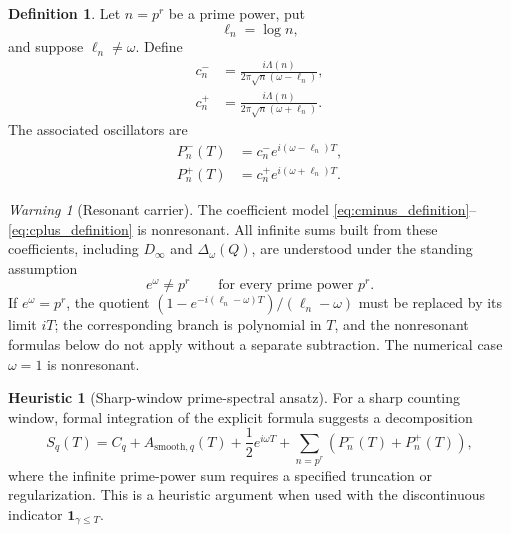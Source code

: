 \documentclass[11pt]{amsart}
\numberwithin{equation}{section}
\theoremstyle{plain}
\theoremstyle{definition}
\newtheorem{definition}[theorem]{Definition}
\newtheorem{heuristic}[theorem]{Heuristic}
\theoremstyle{remark}
\newtheorem{warning}[theorem]{Warning}
\newcommand{\1}{\mathbf{1}}
\begin{document}
\begin{definition}
\label{def:prime_power_coefficients}
Let \(n=p^r\) be a prime power, put
\begin{equation}
\ell_n=\log n,
\label{eq:elln_definition}
\end{equation}
and suppose \(\ell_n\neq\omega\).  Define
\begin{align}
c_n^-
&=
\frac{i\Lambda(n)}
{2\pi\sqrt n(\omega-\ell_n)},
\label{eq:cminus_definition}
\\
c_n^+
&=
\frac{i\Lambda(n)}
{2\pi\sqrt n(\omega+\ell_n)}.
\label{eq:cplus_definition}
\end{align}
The associated oscillators are
\begin{align}
P_n^-(T)
&=
c_n^-e^{i(\omega-\ell_n)T},
\label{eq:Pminus_definition}
\\
P_n^+(T)
&=
c_n^+e^{i(\omega+\ell_n)T}.
\label{eq:Pplus_definition}
\end{align}
\end{definition}

\begin{warning}[Resonant carrier]
\label{warn:prime_power_resonance}
The coefficient model
\eqref{eq:cminus_definition}--\eqref{eq:cplus_definition} is
nonresonant.  All infinite sums built from these coefficients, including
\(D_\infty\) and \(\Delta_\omega(Q)\), are understood under the standing
assumption
\begin{equation}
e^\omega\neq p^r
\qquad
\text{for every prime power }p^r.
\label{eq:nonresonant_carrier_assumption}
\end{equation}
If \(e^\omega=p^r\), the quotient
\((1-e^{-i(\ell_n-\omega)T})/(\ell_n-\omega)\) must be replaced by its
limit \(iT\); the corresponding branch is polynomial in \(T\), and the
nonresonant formulas below do not apply without a separate subtraction.
The numerical case \(\omega=1\) is nonresonant.
\end{warning}

\begin{heuristic}[Sharp-window prime-spectral ansatz]
\label{heur:sharp_window_ansatz}
For a sharp counting window, formal integration of the explicit formula
suggests a decomposition
\begin{equation}
S_q(T)
=
C_q+
A_{\mathrm{smooth},q}(T)
+
\frac12e^{i\omega T}
+
\sum_{n=p^r} \left(P_n^-(T)+P_n^+(T)\right),
\label{eq:formal_sharp_decomposition}
\end{equation}
where the infinite prime-power sum requires a specified truncation or
regularization.  This is a heuristic argument when used with the
discontinuous indicator \(\1_{\gamma\leq T}\).
\end{heuristic}
\end{document}
